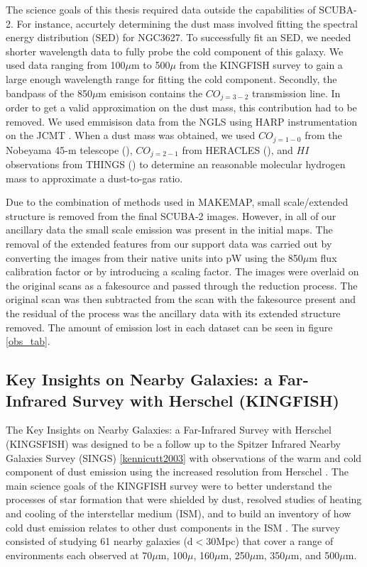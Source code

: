 The science goals of this thesis required data outside the capabilities of SCUBA-2.  For instance, accurtely determining the dust mass involved fitting the spectral energy distribution (SED) for NGC3627.  To successfully fit an SED, we needed shorter wavelength data to fully probe the cold component of this galaxy. We used data ranging from 100$\mu$m to 500$\mu$ from the KINGFISH survey \citet{kennicutt2011} to gain a large enough wavelength range for fitting the cold component.  Secondly, the bandpass of the 850$\mu$m emisison contains the $CO_{j=3-2}$ transmission line.  In order to get a valid approximation on the dust mass, this contribution had to be removed.  We used emmisison data from the NGLS using HARP instrumentation on the JCMT \citet{wilson2012}.  When a dust mass was obtained, we used $CO_{j=1-0}$ from the Nobeyama 45-m telescope (\citet{kuno2007}), $CO_{j=2-1}$ from HERACLES (\protect\citet{leroy2009}), and $HI$ observations from THINGS (\protect\citet{walter2008}) to determine an reasonable molecular hydrogen mass to approximate a dust-to-gas ratio.

Due to the combination of methods used in MAKEMAP, small scale/extended structure is removed from the final SCUBA-2 images.  However, in all of our ancillary data the small scale emission was present in the initial maps.  The removal of the extended features from our support data was carried out by converting the images from their native units into pW using the 850$\mu$m flux calibration factor or by introducing a scaling factor.  The images were overlaid on the original scans as a fakesource and passed through the reduction process.  The original scan was then subtracted from the scan with the fakesource present and the residual of the process was the ancillary data with its extended structure removed.  The amount of emission lost in each dataset can be seen in figure \ref{obs_tab}.

\subsection{Key Insights on Nearby Galaxies: a Far-Infrared Survey with Herschel (KINGFISH)}

The Key Insights on Nearby Galaxies: a Far-Infrared Survey with Herschel (KINGSFISH) was designed to be a follow up to the Spitzer Infrared Nearby Galaxies Survey (SINGS) \ref{kennicutt2003} with observations of the warm and cold component of dust emission using the increased resolution from Herschel \protect\citet{kennicutt2011}.  The main science goals of the KINGFISH survey were to better understand the processes of star formation that were shielded by dust, resolved studies of heating and cooling of the interstellar medium (ISM), and to build an inventory of how cold dust emission relates to other dust components in the ISM \protect\citet{kennicutt2011}.  The survey consisted of studying 61 nearby galaxies (d$<$30Mpc) that cover a range of environments each observed at 70$\mu$m, 100$\mu$, 160$\mu$m, 250$\mu$m, 350$\mu$m, and 500$\mu$m.  

